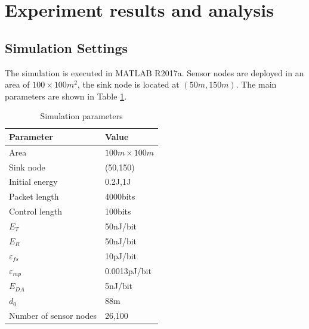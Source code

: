 \documentclass[journal,twoside,web]{ieeecolor}
\begin{document}
\section{Experiment results and analysis}
\subsection{Simulation Settings}
The simulation is executed in MATLAB R2017a. Sensor nodes are deployed in an area of $100 \times 100 m^2$, the sink node is located at $(50m,150m)$. The main parameters are shown in Table \ref{table1}. 

\begin{table}[h!]
	\centering
	\caption{Simulation parameters}
	
	\label{table1}  
	\begin{tabular}{p{4cm}p{3cm}}
		\hline
		\textbf{Parameter} & \textbf{Value}\\
		\hline
		Area & $100m \times 100m$  \\
		\hline
		Sink node & (50,150)\\
		\hline
		Initial energy & 0.2J,1J\\
		\hline
		Packet length & 4000bits\\
		\hline
		Control length & 100bits\\
		\hline
		$E_T$ & 50nJ/bit \\
		\hline
		$E_R$ & 50nJ/bit \\
		\hline
		$\varepsilon_{fs}$ & 10pJ/bit\\
		\hline
		$\varepsilon_{mp}$ & 0.0013pJ/bit\\
		\hline
		$E_{DA}$ & 5nJ/bit\\
		\hline
		$d_0$ & 88m\\
		\hline
		Number of sensor nodes & 26,100\\
		\hline
	\end{tabular}
\end{table}
\end{document}
